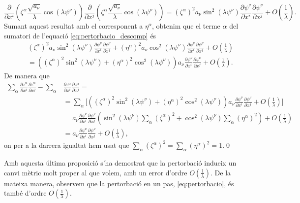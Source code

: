 {\begin{equation*}
    \frac{\partial}{\partial x^i}\left( \zeta^\alpha\frac{\sqrt{a_\nu}}{\lambda}\cos(\lambda \psi^\nu)\right) \frac{\partial}{\partial x^j}\left( \zeta^\alpha\frac{\sqrt{a_\nu}}{\lambda}\cos(\lambda \psi^\nu)\right) = 
    (\zeta^\alpha)^2{a_\nu}\sin^2(\lambda \psi^\nu)\frac{\partial\psi^\nu}{\partial x^i}\frac{\partial\psi^\nu}{\partial x^j} + O\left(\frac1\lambda\right).
\end{equation*}
Sumant aquest resultat amb el corresponent a $\eta^\alpha$, obtenim que el terme $\alpha$ del sumatori de l'equació \eqref{eq:pertorbacio_descomp} és
\begin{align*}
    &(\zeta^\alpha)^2{a_\nu}\sin^2(\lambda \psi^\nu)\frac{\partial\psi^\nu}{\partial x^i}\frac{\partial\psi^\nu}{\partial x^j} + (\eta^\alpha)^2{a_\nu}\cos^2(\lambda \psi^\nu)\frac{\partial\psi^\nu}{\partial x^i}\frac{\partial\psi^\nu}{\partial x^j} + O\left(\frac1\lambda\right)
    \\&=
    ((\zeta^\alpha)^2\sin^2(\lambda \psi^\nu) + (\eta^\alpha)^2\cos^2(\lambda \psi^\nu)) a_\nu\frac{\partial\psi^\nu}{\partial x^i}\frac{\partial\psi^\nu}{\partial x^j} + O\left(\frac1\lambda\right).
\end{align*}
De manera que 
\begin{align*}
    \sum_\alpha\frac{\partial\overline{z}^\alpha}{\partial x^i}\frac{\partial\overline{z}^\alpha}{\partial x^j}-\sum_\alpha&\frac{\partial z^\alpha}{\partial x^i}\frac{\partial z^\alpha}{\partial x^j}=\\
    &=
    \sum_{\alpha}\Bigg[((\zeta^\alpha)^2\sin^2(\lambda \psi^\nu) + (\eta^\alpha)^2\cos^2(\lambda \psi^\nu)) a_\nu\frac{\partial\psi^\nu}{\partial x^i}\frac{\partial\psi^\nu}{\partial x^j}
    + O\left(\frac1\lambda\right) \Bigg]
    \\
    &=a_\nu\frac{\partial\psi^\nu}{\partial x^i}\frac{\partial\psi^\nu}{\partial x^j}\left( \sin^2(\lambda \psi^\nu)\sum_\alpha(\zeta^\alpha)^2 + \cos^2(\lambda \psi^\nu)\sum_\alpha(\eta^\alpha)^2\right) + O\left(\frac1\lambda\right)
    \\&=
    a_\nu\frac{\partial\psi^\nu}{\partial x^i}\frac{\partial\psi^\nu}{\partial x^j} + O\left(\frac1\lambda\right),
\end{align*}
on per a la darrera igualtat hem usat que $\sum_\alpha(\zeta^\alpha)^2 = \sum_\alpha(\eta^\alpha)^2 = 1$.\qed
}

Amb aquesta última proposició s'ha demostrat que la pertorbació indueix un canvi mètric molt proper al que volem, amb un error d'ordre $O\left(\frac1\lambda\right)$. De la mateixa manera, observem que la pertorbació en un pas, \eqref{eq:pertorbacio}, és també d'ordre $O\left(\frac1\lambda\right)$. 


